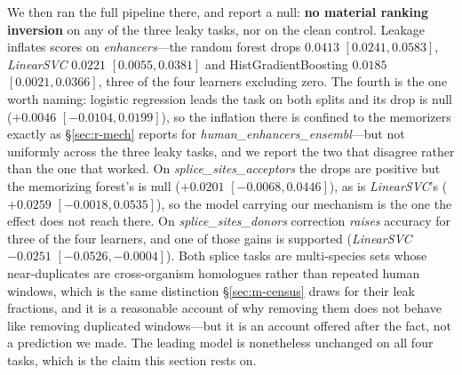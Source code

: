 \documentclass[webpdf,modern,large,namedate]{oup-authoring-template}%
\begin{document}
We then ran the full pipeline there, and report a null: \textbf{no material ranking inversion} on any of the three leaky tasks, nor on the clean control. Leakage inflates scores on \textit{enhancers}---the random forest drops $0.0413$ $[0.0241,0.0583]$, \textit{LinearSVC} $0.0221$ $[0.0055,0.0381]$ and HistGradientBoosting $0.0185$ $[0.0021,0.0366]$, three of the four learners excluding zero. The fourth is the one worth naming: logistic regression leads the task on both splits and its drop is null ($+0.0046$ $[-0.0104,0.0199]$), so the inflation there is confined to the memorizers exactly as \S\ref{sec:r-mech} reports for \textit{human\_enhancers\_ensembl}---but not uniformly across the three leaky tasks, and we report the two that disagree rather than the one that worked. On \textit{splice\_sites\_acceptors} the drops are positive but the memorizing forest's is null ($+0.0201$ $[-0.0068,0.0446]$), as is \textit{LinearSVC}'s ($+0.0259$ $[-0.0018,0.0535]$), so the model carrying our mechanism is the one the effect does not reach there. On \textit{splice\_sites\_donors} correction \emph{raises} accuracy for three of the four learners, and one of those gains is supported (\textit{LinearSVC} $-0.0251$ $[-0.0526,-0.0004]$). Both splice tasks are multi-species sets whose near-duplicates are cross-organism homologues rather than repeated human windows, which is the same distinction \S\ref{sec:m-census} draws for their leak fractions, and it is a reasonable account of why removing them does not behave like removing duplicated windows---but it is an account offered after the fact, not a prediction we made. The leading model is nonetheless unchanged on all four tasks, which is the claim this section rests on.
\end{document}
